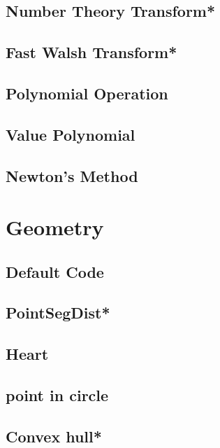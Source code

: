 \subsection{Number Theory Transform*} %

\subsection{Fast Walsh Transform*} %

\subsection{Polynomial Operation}

\subsection{Value Polynomial}

\subsection{Newton's Method}



\section{Geometry}
\subsection{Default Code}

\subsection{PointSegDist*} %

\subsection{Heart}

\subsection{point in circle}

\subsection{Convex hull*} %

